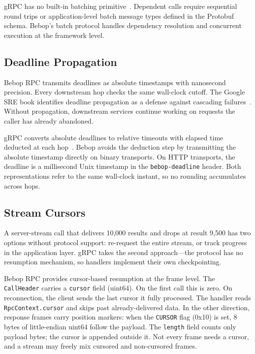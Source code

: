 \documentclass[10pt,onecolumn]{article}
\begin{document}
gRPC has no built-in batching primitive~\cite{grpc-core-concepts}. Dependent calls require sequential round trips or application-level batch message types defined in the Protobuf schema. Bebop's batch protocol handles dependency resolution and concurrent execution at the framework level.

\subsection{Deadline Propagation}

Bebop RPC transmits deadlines as absolute timestamps with nanosecond precision. Every downstream hop checks the same wall-clock cutoff. The Google SRE book identifies deadline propagation as a defense against cascading failures~\cite{google-sre-cascading}. Without propagation, downstream services continue working on requests the caller has already abandoned.

gRPC converts absolute deadlines to relative timeouts with elapsed time deducted at each hop~\cite{grpc-deadlines-guide}. Bebop avoids the deduction step by transmitting the absolute timestamp directly on binary transports. On HTTP transports, the deadline is a millisecond Unix timestamp in the \texttt{bebop-deadline} header. Both representations refer to the same wall-clock instant, so no rounding accumulates across hops.

\subsection{Stream Cursors}
\label{sec:stream-cursors}

A server-stream call that delivers 10{,}000 results and drops at result 9{,}500 has two options without protocol support: re-request the entire stream, or track progress in the application layer. gRPC takes the second approach---the protocol has no resumption mechanism, so handlers implement their own checkpointing.

Bebop RPC provides cursor-based resumption at the frame level. The \texttt{CallHeader} carries a \texttt{cursor} field (uint64). On the first call this is zero. On reconnection, the client sends the last cursor it fully processed. The handler reads \texttt{RpcContext.cursor} and skips past already-delivered data. In the other direction, response frames carry position markers: when the \texttt{CURSOR} flag (0x10) is set, 8 bytes of little-endian uint64 follow the payload. The \texttt{length} field counts only payload bytes; the cursor is appended outside it. Not every frame needs a cursor, and a stream may freely mix cursored and non-cursored frames.
\end{document}
